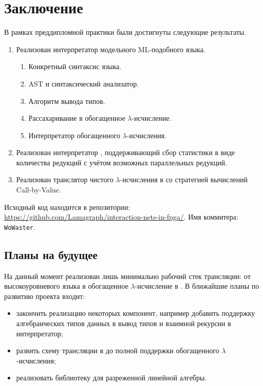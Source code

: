 
\section*{Заключение}

В рамках преддипломной практики были достигнуты следующие результаты.
\begin{enumerate}
      \item Реализован интерпретатор модельного ML-подобного языка.
            \begin{enumerate}
                  \item Конкретный синтаксис языка.
                  \item AST и синтаксический анализатор.
                  \item Алгоритм вывода типов.
                  \item Рассахаривание в обогащенное $\lambda$-исчисление.
                  \item Интерпретатор обогащенного $\lambda$-исчисления.
            \end{enumerate}
      \item Реализован интерпретатор \INs{}, поддерживающий сбор статистики в виде количества редукций с учётом возможных параллельных редукций.
      \item Реализован транслятор чистого $\lambda$-исчисления в \INs{} со стратегией вычислений Call-by-Value.
\end{enumerate}

Исходный код находится в репозитории: \url{https://github.com/Lamagraph/interaction-nets-in-fpga/}.
Имя коммитера: \texttt{WoWaster}.

\subsection*{Планы на будущее}

На данный момент реализован лишь минимально рабочий стек трансляции: от высокоуровневого языка в обогащенное $\lambda$-исчисление в \INs{}.
В ближайшие планы по развитию проекта входит:
\begin{itemize}
      \item закончить реализацию некоторых компонент, например добавить поддержку алгебраических типов данных в вывод типов и взаимной рекурсии в интерпретатор;
      \item развить схему трансляции в \INs{} до полной поддержки обогащенного $\lambda$-исчисления;
      \item реализовать библиотеку для разреженной линейной алгебры.
\end{itemize}
